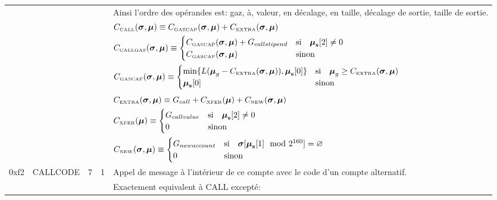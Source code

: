 \documentclass[9pt,oneside]{amsart}
\begin{document}
\begin{tabular*}{\columnwidth}[h]{rlrrl}
&&&& Ainsi l'ordre des opérandes est: gaz, à, valeur, en décalage, en taille, décalage de sortie, taille de sortie. \\
&&&& $C_{\text{\tiny CALL}}(\boldsymbol{\sigma}, \boldsymbol{\mu}) \equiv C_{\text{\tiny GASCAP}}(\boldsymbol{\sigma}, \boldsymbol{\mu}) + C_{\text{\tiny EXTRA}}(\boldsymbol{\sigma}, \boldsymbol{\mu})$ \\
&&&& $C_{\text{\tiny CALLGAS}}(\boldsymbol{\sigma}, \boldsymbol{\mu}) \equiv  \begin{cases}
C_{\text{\tiny GASCAP}}(\boldsymbol{\sigma}, \boldsymbol{\mu}) + G_{callstipend} & \text{si} \quad \boldsymbol{\mu}_\mathbf{s}[2] \neq 0 \\
C_{\text{\tiny GASCAP}}(\boldsymbol{\sigma}, \boldsymbol{\mu}) & \text{sinon}
\end{cases}$ \\
&&&& $C_{\text{\tiny GASCAP}}(\boldsymbol{\sigma}, \boldsymbol{\mu}) \equiv \begin{cases}
\min\{ L(\boldsymbol{\mu}_g - C_{\text{\tiny EXTRA}}(\boldsymbol{\sigma}, \boldsymbol{\mu})), \boldsymbol{\mu}_{\mathbf{s}}[0] \} & \text{si} \quad \boldsymbol{\mu}_g \ge C_{\text{\tiny EXTRA}}(\boldsymbol{\sigma}, \boldsymbol{\mu})\\
\boldsymbol{\mu}_{\mathbf{s}}[0] & \text{sinon}
\end{cases}$\\
&&&& $C_{\text{\tiny EXTRA}}(\boldsymbol{\sigma}, \boldsymbol{\mu}) \equiv G_{call} + C_{\text{\tiny XFER}}(\boldsymbol{\mu}) + C_{\text{\tiny NEW}}(\boldsymbol{\sigma}, \boldsymbol{\mu})$\\
&&&& $C_{\text{\tiny XFER}}(\boldsymbol{\mu}) \equiv \begin{cases}
G_{callvalue} & \text{si} \quad \boldsymbol{\mu}_\mathbf{s}[2] \neq 0 \\
0 & \text{sinon}
\end{cases}$ \\
&&&& $C_{\text{\tiny NEW}}(\boldsymbol{\sigma}, \boldsymbol{\mu}) \equiv \begin{cases}
G_{newaccount} & \text{si} \quad \boldsymbol{\sigma}[\boldsymbol{\mu}_\mathbf{s}[1] \mod 2^{160}] = \varnothing \\
0 & \text{sinon}
\end{cases}$ \\
\midrule
0xf2 & {\small CALLCODE} & 7 & 1 & Appel de message à l'intérieur de ce compte avec le code d'un compte alternatif. \\
&&&& Exactement equivalent à {\small CALL} excepté: \\

\end{tabular*}
\end{document}
